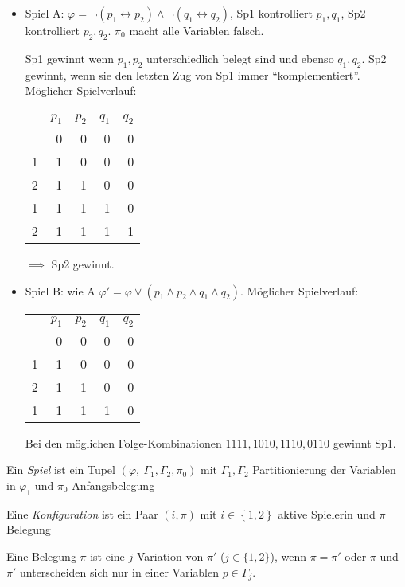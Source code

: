 \begin{tafel}\mbox{}
    \begin{itemize}
        \item Spiel A: $\varphi = \neg (p_1 \leftrightarrow p_2) \wedge \neg (q_1 \leftrightarrow q_2)$,
            Sp1 kontrolliert $p_1, q_1$, Sp2 kontrolliert $p_2, q_2$. $\pi_0$ macht alle Variablen falsch.

            Sp1 gewinnt wenn $p_1, p_2$ unterschiedlich belegt sind und ebenso $q_1, q_2$. Sp2 gewinnt, wenn sie den letzten Zug von Sp1 immer \enquote{komplementiert}.
            Möglicher Spielverlauf:
            \begin{center}
            \begin{tabular}{rrrrr}
                & $p_1$ & $p_2$ & $q_1$ & $q_2$\\
                & 0 & 0 & 0 & 0\\
                1 & 1 & 0 & 0 & 0\\
                2 & 1 & 1 & 0 & 0\\
                1 & 1 & 1 & 1 & 0\\
                2 & 1 & 1 & 1 & 1\\
            \end{tabular}
        \end{center}

        $\implies$ Sp2 gewinnt.

    \item Spiel B: wie A $\varphi' = \varphi \vee (p_1 \wedge p_2 \wedge q_1 \wedge q_2)$.
        Möglicher Spielverlauf:
            \begin{center}
            \begin{tabular}{rrrrr}
                & $p_1$ & $p_2$ & $q_1$ & $q_2$\\
                & 0 & 0 & 0 & 0\\
                1 & 1 & 0 & 0 & 0\\
                2 & 1 & 1 & 0 & 0\\
                1 & 1 & 1 & 1 & 0\\
            \end{tabular}
        \end{center}
            Bei den möglichen Folge-Kombinationen $1111, 1010, 1110, 0110$ gewinnt Sp1.
    \end{itemize}
\end{tafel}

\begin{definition}
    Ein \emph{Spiel} ist ein Tupel $\left( \varphi,\ \Gamma_1,\Gamma_2,\pi_{0} \right)$ mit $\Gamma_1,\Gamma_2$ Partitionierung der Variablen in
  $\varphi_1$ und $\pi_{0}$ Anfangsbelegung

    Eine \emph{Konfiguration} ist ein Paar $(i,\pi)$ mit
  $i \in \left\{ 1,2 \right\}$ aktive Spielerin und $\pi$ Belegung

    Eine Belegung $\pi$ ist eine $j$-Variation von $\pi'$ ($j \in \{1, 2\}$), wenn $\pi = \pi'$ oder $\pi$ und $\pi'$ unterscheiden sich nur in einer Variablen $p \in \Gamma_j$.
\end{definition}


